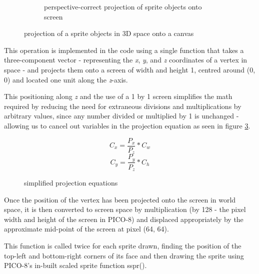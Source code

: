 \documentclass{article}
\begin{document}
\begin{figure}[h]
\begin{subfigure}{1\textwidth}
   \caption{perspective-correct projection of sprite objects onto screen}
   \label{fig:rotfig2}
\end{subfigure}\hfill
\caption{projection of a sprite objects in 3D space onto a canvas}
\label{fig:projection}
\end{figure}

This operation is implemented in the code using a single function that takes a three-component vector -
representing the \textit{x}, \textit{y}, and \textit{z} coordinates of a vertex in space - and projects them
onto a screen of width and height 1, centred around (0, 0) and located one unit along the \textit{z}-axis.

This positioning along \textit{z} and the use of a 1 by 1 screen simplifies the math required by reducing the
need for extraneous divisions and multiplications by arbitrary values, since any number divided or multiplied 
by 1 is unchanged - allowing us to cancel out variables in the projection equation as seen in
figure \ref{fig:equationsimpleproject}.

\begin{figure}[h]
   \begin{equation}
      C_x = \frac{P_x} {P_z} * C_w
   \end{equation}
   \begin{equation}
      C_y = \frac{P_y} {P_z} * C_h
   \end{equation}
   \caption{simplified projection equations}
   \label{fig:equationsimpleproject}
\end{figure}

Once the position of the vertex has been projected onto the screen in world space, it is then converted to
screen space by multiplication (by 128 - the pixel width and height of the screen in PICO-8) and displaced
appropriately by the approximate mid-point of the screen at pixel (64, 64).

This function is called twice for each sprite drawn, finding the position of the top-left and bottom-right
corners of its face and then drawing the sprite using PICO-8's in-built scaled sprite function sspr().
\end{document}
